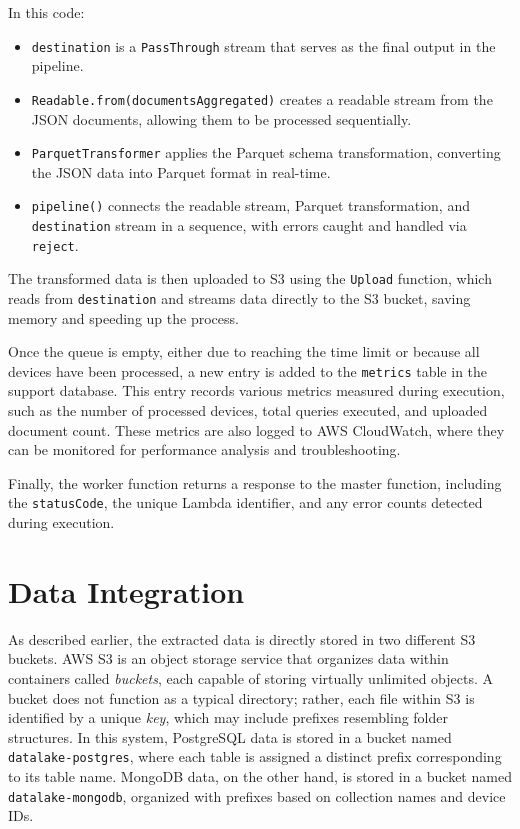 In this code:
\begin{itemize}
    \item \texttt{destination} is a \texttt{PassThrough} stream that serves as the final output in the pipeline.
    \item \texttt{Readable.from(documentsAggregated)} creates a readable stream from the JSON documents, allowing them to be processed sequentially.
    \item \texttt{ParquetTransformer} applies the Parquet schema transformation, converting the JSON data into Parquet format in real-time.
    \item \texttt{pipeline()} connects the readable stream, Parquet transformation, and \texttt{destination} stream in a sequence, with errors caught and handled via \texttt{reject}.
\end{itemize}
The transformed data is then uploaded to S3 using the \texttt{Upload} function, which reads from \texttt{destination} and streams data directly to the S3 bucket, saving memory and speeding up the process.

Once the queue is empty, either due to reaching the time limit or because all devices have been processed, a new entry is added to the \texttt{metrics} table in the support database. This entry records various metrics measured during execution, such as the number of processed devices, total queries executed, and uploaded document count. These metrics are also logged to AWS CloudWatch, where they can be monitored for performance analysis and troubleshooting.

Finally, the worker function returns a response to the master function, including the \texttt{statusCode}, the unique Lambda identifier, and any error counts detected during execution.

\section{Data Integration}
As described earlier, the extracted data is directly stored in two different S3 buckets. AWS S3 is an object storage service that organizes data within containers called \textit{buckets}, each capable of storing virtually unlimited objects. A bucket does not function as a typical directory; rather, each file within S3 is identified by a unique \textit{key}, which may include prefixes resembling folder structures. In this system, PostgreSQL data is stored in a bucket named \texttt{datalake-postgres}, where each table is assigned a distinct prefix corresponding to its table name. MongoDB data, on the other hand, is stored in a bucket named \texttt{datalake-mongodb}, organized with prefixes based on collection names and device IDs.

